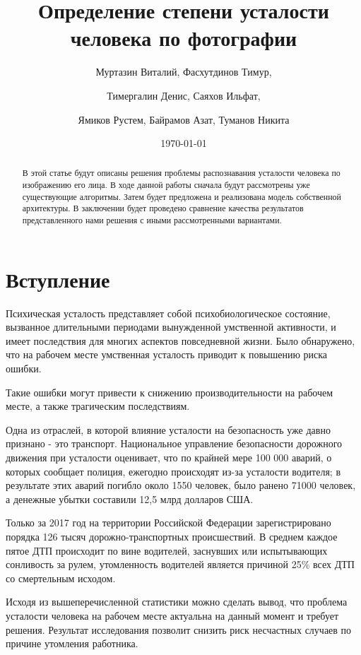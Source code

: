 \documentclass[12pt, letterpaper]{article}
\title{Определение степени усталости человека по фотографии}
\date{\today}
\author{Муртазин Виталий, Фасхутдинов Тимур, \and
Тимергалин Денис, Саяхов Ильфат, \and
Ямиков Рустем, Байрамов Азат, Туманов Никита
}
\begin{document}
    \maketitle

    \begin{abstract}
        В этой статье будут описаны решения проблемы распознавания усталости человека по изображению его лица.
        В ходе данной работы сначала будут рассмотрены уже существующие алгоритмы.
        Затем будет предложена и реализована модель собственной архитектуры.
        В заключении будет проведено сравнение качества результатов представленного нами решения с иными рассмотренными вариантами.
    \end{abstract}

    \section{Вступление}\label{sec:introduction}
    Психическая усталость представляет собой психобиологическое состояние, вызванное длительными периодами вынужденной умственной активности, и имеет последствия для многих аспектов повседневной жизни.\cite{hullermeier_fuzzy_2009}
    Было обнаружено, что на рабочем месте умственная усталость приводит к повышению риска ошибки.

    Такие ошибки могут привести к снижению производительности на рабочем месте, а также трагическим последствиям.

    Одна из отраслей, в которой влияние усталости на безопасность уже давно признано - это транспорт.
    Национальное управление безопасности дорожного движения при усталости оценивает, что по крайней мере 100 000 аварий, о которых сообщает полиция, ежегодно происходят из-за усталости водителя;
    в результате этих аварий погибло около 1550 человек, было ранено 71000 человек, а денежные убытки составили 12,5 млрд долларов США.\cite{lancichinetti_benchmarks_2009}

    Только за 2017 год на территории Российской Федерации зарегистрировано порядка 126 тысяч дорожно-транспортных происшествий.
    В среднем каждое пятое ДТП происходит по вине водителей, заснувших или испытывающих сонливость за рулем, утомленность водителей является причиной 25\% всех ДТП со смертельным исходом.

    Исходя из вышеперечисленной статистики можно сделать вывод, что проблема усталости человека на рабочем месте актуальна на данный момент и требует решения.
    Результат исследования позволит снизить риск несчастных случаев по причине утомления работника.
\end{document}
